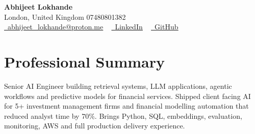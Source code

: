 \documentclass[a4paper,10pt]{article}
\begin{document}
    \begin{center}
        {\Huge\bfseries Abhijeet Lokhande}
        \\[2pt] {\color{muted}London, United Kingdom \textbar{} 07480801382}\\
        \small
        \href{mailto:abhijeet_lokhande@proton.me}{\raisebox{-0.2\height}{\color{primary}\faEnvelope}\  \underline{abhijeet\_lokhande@proton.me}} ~
        \href{https://www.linkedin.com/in/ablds/}{\raisebox{-0.2\height}{\color{primary}\faLinkedin}\ \underline{LinkedIn}}  ~
        \href{https://github.com/abhijeetscode}{\raisebox{-0.2\height}{\color{primary}\faGithub}\ \underline{GitHub}}
    \end{center}

\section{Professional Summary}
\vspace{-5pt}
{\color{muted}Senior AI Engineer building retrieval systems, LLM applications, agentic workflows and predictive models for financial services. Shipped client facing AI for 5+ investment management firms and financial modelling automation that reduced analyst time by 70\%. Brings Python, SQL, embeddings, evaluation, monitoring, AWS and full production delivery experience.}
\vspace{2pt}

\end{document}
